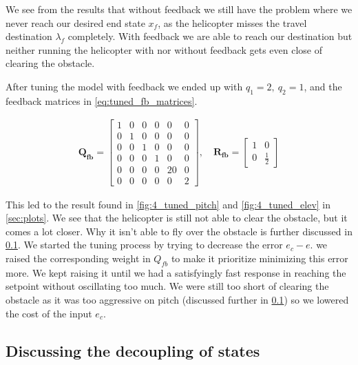 We see from the results that without feedback we still have the problem where we never reach our desired end state $x_f$, as the helicopter misses the travel destination $\lambda_f$ completely. With feedback we are able to reach our destination but neither running the helicopter with nor without feedback gets even close of clearing the obstacle.

After tuning the model with feedback we ended up with $q_1 = 2,\ q_2 = 1$, and the feedback matrices in \cref{eq:tuned_fb_matrices}.

\begin{equation}\label{eq:tuned_fb_matrices}
    \begin{aligned}
        \mathbf{Q_{fb}} =
        \begin{bmatrix} 
        1 & 0 & 0 & 0 & 0 & 0 \\ 0 & 1 & 0 & 0 &  0 & 0 \\ 0 & 0 & 1 & 0 & 0 & 0 \\ 
        0 & 0 & 0 & 1 & 0 & 0 \\ 0 & 0 & 0 & 0 & 20 & 0 \\ 0 & 0 & 0 & 0 & 0 & 2
        \end{bmatrix}, \quad
        \mathbf{R_{fb}} =
        \begin{bmatrix} 1 & 0 \\ 0 & \frac{1}{2}  \end{bmatrix}
    \end{aligned}
\end{equation}

This led to the result found in \cref{fig:4_tuned_pitch} and \cref{fig:4_tuned_elev} in \cref{sec:plots}. We see that the helicopter is still not able to clear the obstacle, but it comes a lot closer. Why it isn't able to fly over the obstacle is further discussed in \cref{sec:ex4.5}. 
We started the tuning process by trying to decrease the error $e_c-e$. we raised the corresponding weight in $Q_{fb}$ to make it prioritize minimizing this error more. We kept raising it until we had a satisfyingly fast response in reaching the setpoint without oscillating too much. We were still too short of clearing the obstacle as it was too aggressive on pitch (discussed further in \cref{sec:ex4.5}) so we lowered the cost of the input $e_c$.

\subsection{Discussing the decoupling of states}\label{sec:ex4.5}

